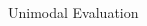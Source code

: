 \documentclass[final]{beamer}
\newcommand{\setblocksize}{\LARGE \centering}
\begin{document}
\begin{frame}{}
\begin{columns}[t]
\begin{column}{0.24\linewidth}
\begin{block}{\setblocksize Unimodal Evaluation}
{}
\end{block}

\end{column}	%

\end{columns}

\end{frame}
\end{document}
